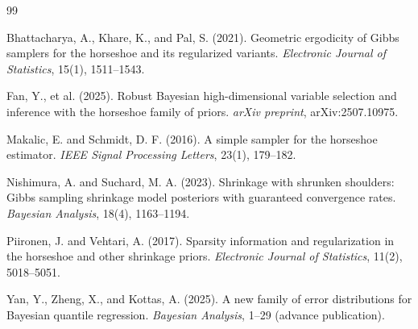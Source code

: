 \documentclass[11pt]{article}
\begin{document}
\begin{thebibliography}{99}

Bhattacharya, A., Khare, K., and Pal, S. (2021).
Geometric ergodicity of Gibbs samplers for the horseshoe and its regularized variants.
\emph{Electronic Journal of Statistics}, 15(1), 1511--1543.

Fan, Y., et al. (2025).
Robust Bayesian high-dimensional variable selection and inference with the horseshoe family of priors.
\emph{arXiv preprint}, arXiv:2507.10975.

Makalic, E. and Schmidt, D. F. (2016).
A simple sampler for the horseshoe estimator.
\emph{IEEE Signal Processing Letters}, 23(1), 179--182.

Nishimura, A. and Suchard, M. A. (2023).
Shrinkage with shrunken shoulders: Gibbs sampling shrinkage model posteriors with guaranteed convergence rates.
\emph{Bayesian Analysis}, 18(4), 1163--1194.

Piironen, J. and Vehtari, A. (2017).
Sparsity information and regularization in the horseshoe and other shrinkage priors.
\emph{Electronic Journal of Statistics}, 11(2), 5018--5051.

Yan, Y., Zheng, X., and Kottas, A. (2025).
A new family of error distributions for Bayesian quantile regression.
\emph{Bayesian Analysis}, 1--29 (advance publication).

\end{thebibliography}
\end{document}
